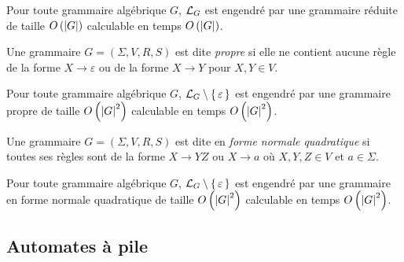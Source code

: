\documentclass[../../agregation.tex]{subfiles}
\begin{document}
\begin{prop}
	Pour toute grammaire algébrique $G$, $\mathcal{L}_{G}$ est engendré par une grammaire réduite de taille $O\left(\left|G\right|\right)$
	calculable en temps $O\left(\left|G\right|\right)$.
\end{prop}

\begin{defn}
	Une grammaire $G=(\Sigma,V,R,S)$ est dite \emph{propre} si elle ne contient aucune règle de la forme $X\to \varepsilon$ ou de la forme $X\to Y$ pour $X,Y\in V$.
\end{defn}

\begin{prop}
	Pour toute grammaire algébrique $G$, $\mathcal{L}_{G}\setminus\set{\varepsilon}$ est engendré par une grammaire
	propre de taille $O\left(\left|G\right|^{2}\right)$ calculable en temps $O\left(\left|G\right|^{2}\right)$.
\end{prop}

\begin{defn}
	Une grammaire $G=(\Sigma,V,R,S)$ est dite en \emph{forme normale quadratique} si toutes ses règles sont de la forme $X\to YZ$ ou $X\to a$ où $X,Y,Z\in V$ et $a\in\Sigma$.
\end{defn}

\begin{prop}
	Pour toute grammaire algébrique $G$, $\mathcal{L}_{G}\setminus\set{\varepsilon}$ est engendré par une grammaire
	en forme normale quadratique de taille $O\left(\left|G\right|^{2}\right)$
	calculable en temps $O\left(\left|G\right|^{2}\right)$.
\end{prop}


\subsection{Automates à pile} %
\end{document}

